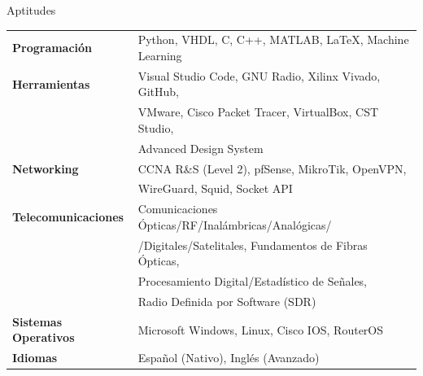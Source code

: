 \documentclass{resume} %
\begin{document}

\begin{rSection}{Aptitudes}

    \begin{tabular}{ @{} >{\bfseries}l @{\hspace{6ex}} l }
        Programación        & Python, VHDL, C, C++, MATLAB, \LaTeX, Machine Learning \\
        Herramientas        & Visual Studio Code, GNU Radio, Xilinx Vivado, GitHub,  \\ & VMware, Cisco Packet Tracer, VirtualBox, CST Studio, \\
                            & Advanced Design System                                 \\
        Networking          & CCNA R\&S (Level 2), pfSense, MikroTik, OpenVPN,       \\ & WireGuard, Squid, Socket API                                            \\
        Telecomunicaciones  & Comunicaciones Ópticas/RF/Inalámbricas/Analógicas/     \\ & /Digitales/Satelitales, Fundamentos de Fibras Ópticas, \\ & Procesamiento Digital/Estadístico de Señales, \\
                            & Radio Definida por Software (SDR)                      \\
        Sistemas Operativos & Microsoft Windows, Linux, Cisco IOS, RouterOS          \\
        Idiomas             & Español (Nativo), Inglés (Avanzado)
    \end{tabular}

\end{rSection}
\end{document}
